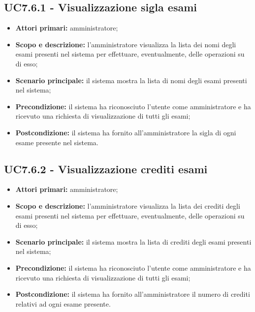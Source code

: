 \documentclass[AnalisiDeiRequisiti.tex]{subfiles}
\begin{document}
\subsection{UC7.6.1 - Visualizzazione sigla esami}
\begin{itemize}
	\item \textbf{Attori primari:} amministratore;
	\item \textbf{Scopo e descrizione:} l'amministratore visualizza la lista dei nomi degli esami presenti nel sistema per effettuare, eventualmente, delle operazioni su di esso;
	\item \textbf{Scenario principale:} il sistema mostra la lista di nomi degli esami presenti nel sistema;
	\item \textbf{Precondizione:} il sistema ha riconosciuto l'utente come amministratore e ha ricevuto una richiesta di visualizzazione di tutti gli esami; 
	\item \textbf{Postcondizione:} il sistema ha fornito all'amministratore la sigla di ogni esame presente nel sistema.
\end{itemize}
\subsection{UC7.6.2 - Visualizzazione crediti esami}
\begin{itemize}
	\item \textbf{Attori primari:} amministratore;
	\item \textbf{Scopo e descrizione:} l'amministratore visualizza la lista dei crediti degli esami presenti nel sistema per effettuare, eventualmente, delle operazioni su di esso;
	\item \textbf{Scenario principale:} il sistema mostra la lista di crediti degli esami presenti nel sistema;
	\item \textbf{Precondizione:} il sistema ha riconosciuto l'utente come amministratore e ha ricevuto una richiesta di visualizzazione di tutti gli esami; 
	\item \textbf{Postcondizione:} il sistema ha fornito all'amministratore il numero di crediti relativi ad ogni esame presente.
\end{itemize}
\end{document}
